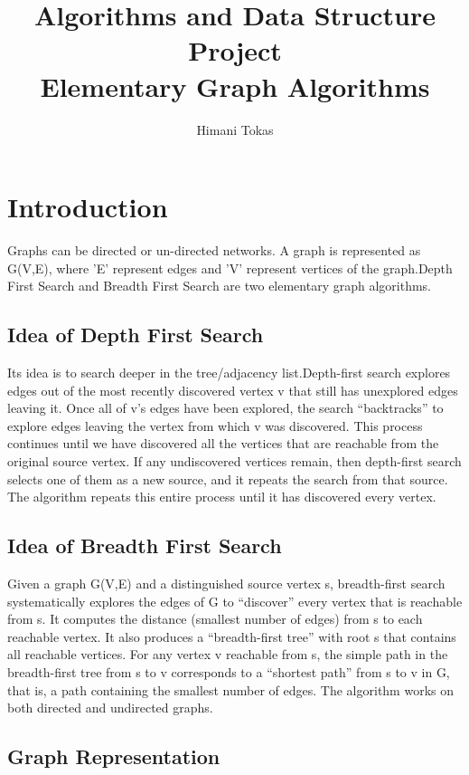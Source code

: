\documentclass[12pt,runningheads]{article}
\begin{document}
\title{Algorithms and Data Structure Project\\Elementary Graph Algorithms}
\author{Himani Tokas}
\maketitle

\section{Introduction}
Graphs can be directed or un-directed networks. A graph is represented as G(V,E), where 'E' represent edges and 'V' represent vertices of the graph.Depth First Search and Breadth First Search are two elementary graph algorithms.


\subsection{Idea of Depth First Search}
Its idea is to search deeper in the tree/adjacency list.Depth-first search explores edges out
of the most recently discovered vertex v that still has unexplored edges leaving it.
Once all of v’s edges have been explored, the search “backtracks” to explore edges
leaving the vertex from which v was discovered. This process continues until we
have discovered all the vertices that are reachable from the original source vertex.
If any undiscovered vertices remain, then depth-first search selects one of them as
a new source, and it repeats the search from that source. The algorithm repeats this
entire process until it has discovered every vertex.
\subsection{Idea of Breadth First Search}
Given a graph G(V,E) and a distinguished source vertex s, breadth-first
search systematically explores the edges of G to “discover” every vertex that is
reachable from s. It computes the distance (smallest number of edges) from s
to each reachable vertex. It also produces a “breadth-first tree” with root s that
contains all reachable vertices. For any vertex v reachable from s, the simple path
in the breadth-first tree from s to v corresponds to a “shortest path” from s to v
in G, that is, a path containing the smallest number of edges. The algorithm works
on both directed and undirected graphs.
\subsection{Graph Representation}
\end{document}
